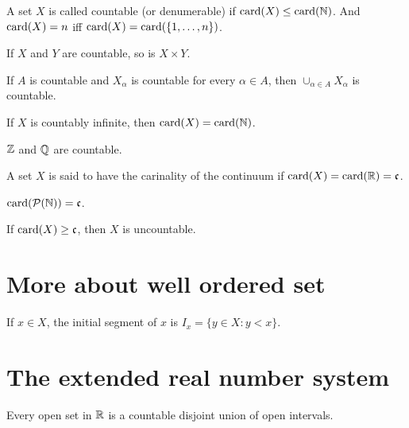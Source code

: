 \begin{definition}
A set $X$ is called countable (or denumerable) if $\mathrm{card} (X) \le \mathrm{card} (\mathbb{N})$.
And $\mathrm{card} (X) = n$ iff $\mathrm{card} (X) = \mathrm{card} (\{ 1, \dots, n \})$.
\end{definition}

\begin{proposition}
If $X$ and $Y$ are countable, so is $X \times Y$.
\end{proposition}

\begin{proposition}
If $A$ is countable and $X_{\alpha}$ is countable for every $\alpha \in A$, then $\cup_{\alpha \in A} X_{\alpha}$ is countable.
\end{proposition}

\begin{proposition}
If $X$ is countably infinite, then $\mathrm{card}(X) = \mathrm{card}(\mathbb{N})$.
\end{proposition}

\begin{proposition}
$\mathbb{Z}$ and $\mathbb{Q}$ are countable.
\end{proposition}

\begin{definition}
A set $X$ is said to have the carinality of the continuum if $\mathrm{card}(X) = \mathrm{card}(\mathbb{R}) = \mathfrak{c}$.
\end{definition}


\begin{proposition}
$\mathrm{card}(\mathcal{P}(\mathbb{N})) = \mathfrak{c}$.
\end{proposition}

\begin{corollary}
If $\mathrm{card}(X) \ge \mathfrak{c}$, then $X$ is uncountable.
\end{corollary}

\section{More about well ordered set}

\begin{definition}
If $x \in X$, the initial segment of $x$ is $I_x = \{ y \in X : y < x \}$.
\end{definition}

\section{The extended real number system}

\begin{proposition}
Every open set in $\mathbb{R}$ is a countable disjoint union of open intervals.
\end{proposition}

